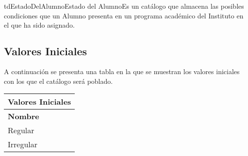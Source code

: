 \begin{TipoDeDato}{tdEstadoDelAlumno}{Estado del Alumno}{Es un catálogo que almacena las posibles condiciones que un Alumno presenta en un programa académico del Instituto en el que ha sido asignado.}

	\begin{tdAtributos}
	
	
	\end{tdAtributos}

	\subsection{Valores Iniciales}
	A continuación se presenta una tabla en la que se muestran los valores iniciales con los que el catálogo será poblado. \cdtEmpty
		\begin{longtable}{|p{}|}
				\hline
				\rowcolor{colorPrincipal}
	 			\bf \color{white} Valores Iniciales\\
	 			\hline
	 			\rowcolor{colorSecundario}
	 			\bf\color{white}Nombre \\
	 			\hline
	 			Regular \\
	 			\hline
	 			Irregular\\
	 			\hline
		\end{longtable}
\end{TipoDeDato}

